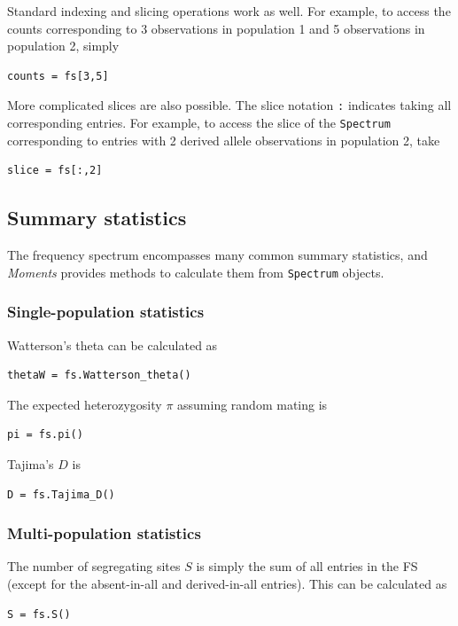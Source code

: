 \documentclass[12pt]{article}
\makeatletter
\newcommand{\py}[1]{\lstinline[language=Python, showstringspaces=False]@#1@}
\makeatother
\begin{document}
Standard indexing and slicing operations work as well.
For example, to access the counts corresponding to 3 observations in population 1 and 5 observations in population 2, simply
\begin{lstlisting}
counts = fs[3,5]
\end{lstlisting}
More complicated slices are also possible.
The slice notation \py{:} indicates taking all corresponding entries.
For example, to access the slice of the \py{Spectrum} corresponding to entries with 2 derived allele observations in population 2, take
\begin{lstlisting}
slice = fs[:,2]
\end{lstlisting}

\subsection{Summary statistics}

The frequency spectrum encompasses many common summary statistics, and \textit{Moments} provides methods to calculate them from \py{Spectrum} objects.

\subsubsection{Single-population statistics}

Watterson's theta can be calculated as
\begin{lstlisting}
thetaW = fs.Watterson_theta()
\end{lstlisting}

The expected heterozygosity $\pi$ assuming random mating is
\begin{lstlisting}
pi = fs.pi()
\end{lstlisting}

Tajima's $D$ is
\begin{lstlisting}
D = fs.Tajima_D()
\end{lstlisting}

\subsubsection{Multi-population statistics}

The number of segregating sites $S$ is simply the sum of all entries in the FS (except for the absent-in-all and derived-in-all entries).
This can be calculated as
\begin{lstlisting}
S = fs.S()
\end{lstlisting}
\end{document}
